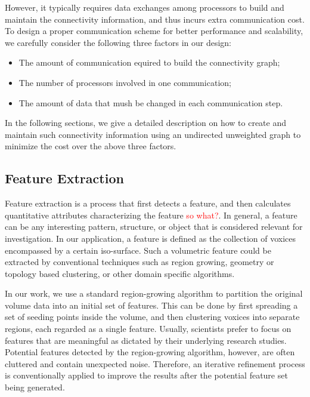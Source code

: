 \documentclass[10pt, conference, compsocconf]{IEEEtran}
\begin{document}
However, it typically requires data exchanges among processors to build and maintain the connectivity information, and thus incurs extra communication cost. To design a proper communication scheme for better performance and scalability, we carefully consider the following three factors in our design:

\begin{itemize}
\item The amount of communication equired to build the connectivity graph;
\item The number of processors involved in one communication;
\item The amount of data that mush be changed in each communication step.
\end{itemize}

In the following sections, we give a detailed description on how to create and maintain such connectivity information using an undirected unweighted graph to minimize the cost over the above three factors.

\subsection{Feature Extraction}

Feature extraction is a process that first detects a feature, and then calculates quantitative attributes characterizing the feature \textcolor{red}{so what?}. In general, a feature can be any interesting pattern, structure, or object that is considered relevant for investigation. In our application, a feature is defined as the collection of voxices encompassed by a certain iso-surface. Such a volumetric feature could be extracted by conventional techniques such as region growing, geometry or topology based clustering, or other domain specific algorithms.

In our work, we use a standard region-growing algorithm \cite{Huang2003} to partition the original volume data into an initial set of features. This can be done by first spreading a set of seeding points inside the volume, and then clustering voxices into separate regions, each regarded as a single feature. Usually, scientists prefer to focus on features that are meaningful as dictated by their underlying research studies. Potential features detected by the region-growing algorithm, however, are often cluttered and contain unexpected noise. Therefore, an iterative refinement process is conventionally applied to improve the results after the potential feature set being generated. 
\end{document}
